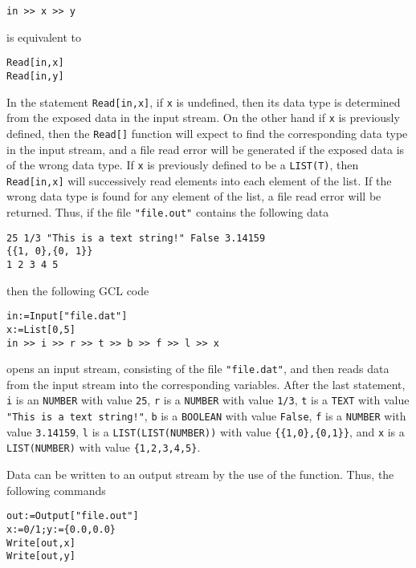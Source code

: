 \begin{verbatim}
in >> x >> y
\end{verbatim}
 
\noindent
is equivalent to 

\begin{verbatim}
Read[in,x]
Read[in,y]
\end{verbatim}

\noindent
In the statement \verb+Read[in,x]+, if \verb+x+ is undefined, then its
data type is determined from the exposed data in the input stream.  On
the other hand if \verb+x+ is previously defined, then the
\verb+Read[]+ function will expect to find the corresponding data type
in the input stream, and a file read error will be generated if the
exposed data is of the wrong data type.  If \verb+x+ is previously
defined to be a \verb+LIST(T)+, then \verb+Read[in,x]+ will
successively read elements into each element of the list.  If the
wrong data type is found for any element of the list, a file read
error will be returned.  Thus, if the file \verb+"file.out"+ contains
the following data

\begin{verbatim}
25 1/3 "This is a text string!" False 3.14159 
{{1, 0},{0, 1}}
1 2 3 4 5
\end{verbatim}

\noindent
then the following GCL code

\begin{verbatim}
in:=Input["file.dat"]
x:=List[0,5]
in >> i >> r >> t >> b >> f >> l >> x
\end{verbatim}

\noindent
opens an input stream, consisting of the file \verb+"file.dat"+, and
then reads data from the input stream into the corresponding
variables.  After the last statement, 
\verb+i+ is an \verb+NUMBER+ with value \verb+25+, 
\verb+r+ is a \verb+NUMBER+ with value \verb+1/3+, 
\verb+t+ is a \verb+TEXT+ with value \verb+"This is a text string!"+, 
\verb+b+ is a \verb+BOOLEAN+ with value \verb+False+, 
\verb+f+ is a \verb+NUMBER+ with value \verb+3.14159+, 
\verb+l+ is a \verb+LIST(LIST(NUMBER))+ with value \verb+{{1,0},{0,1}}+, and 
\verb+x+ is a \verb+LIST(NUMBER)+ with value \verb+{1,2,3,4,5}+.  

Data can be written to an output stream by the use of the
 function.  Thus, the following commands

\begin{verbatim}
out:=Output["file.out"]
x:=0/1;y:={0.0,0.0}
Write[out,x]
Write[out,y]
\end{verbatim}

